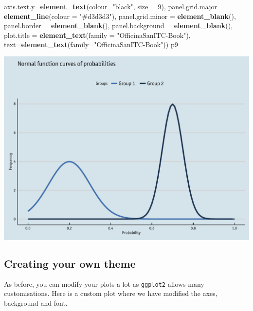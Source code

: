 \documentclass[]{article}
\newenvironment{Shaded}{\begin{snugshade}}{\end{snugshade}}
\newcommand{\KeywordTok}[1]{\textcolor[rgb]{0.13,0.29,0.53}{\textbf{{#1}}}}
\newcommand{\DataTypeTok}[1]{\textcolor[rgb]{0.13,0.29,0.53}{{#1}}}
\newcommand{\DecValTok}[1]{\textcolor[rgb]{0.00,0.00,0.81}{{#1}}}
\newcommand{\StringTok}[1]{\textcolor[rgb]{0.31,0.60,0.02}{{#1}}}
\newcommand{\NormalTok}[1]{{#1}}
\begin{document}
\begin{Shaded}
\begin{Highlighting}[]
            \DataTypeTok{axis.text.y=}\KeywordTok{element_text}\NormalTok{(}\DataTypeTok{colour=}\StringTok{"black"}\NormalTok{, }\DataTypeTok{size =} \DecValTok{9}\NormalTok{),}
            \DataTypeTok{panel.grid.major =} \KeywordTok{element_line}\NormalTok{(}\DataTypeTok{colour =} \StringTok{"#d3d3d3"}\NormalTok{), }
            \DataTypeTok{panel.grid.minor =} \KeywordTok{element_blank}\NormalTok{(), }
            \DataTypeTok{panel.border =} \KeywordTok{element_blank}\NormalTok{(), }\DataTypeTok{panel.background =} \KeywordTok{element_blank}\NormalTok{(),}
            \DataTypeTok{plot.title =} \KeywordTok{element_text}\NormalTok{(}\DataTypeTok{family =} \StringTok{"OfficinaSanITC-Book"}\NormalTok{),}
            \DataTypeTok{text=}\KeywordTok{element_text}\NormalTok{(}\DataTypeTok{family=}\StringTok{"OfficinaSanITC-Book"}\NormalTok{))}
\NormalTok{p9}
\end{Highlighting}
\end{Shaded}

\begin{center}\includegraphics{0_all_posts_pdf/function_15-1} \end{center}

\subsection{Creating your own theme}\label{creating-your-own-theme-8}

As before, you can modify your plots a lot as \texttt{ggplot2} allows
many customisations. Here is a custom plot where we have modified the
axes, background and font.
\end{document}
